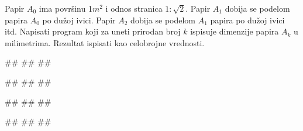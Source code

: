 \begin{Exercise}[difficulty=1, label=p1.papir] 
Papir $A_0$ ima povr\v sinu 1$m^2$ i odnos stranica
$1:\sqrt{2}$. Papir $A_1$ dobija se podelom papira $A_0$ po dužoj
ivici. Papir $A_2$ dobija se podelom $A_1$ papira po dužoj ivici
itd. Napisati program koji za uneti prirodan broj $k$ ispisuje 
dimenzije papira $A_k$ u milimetrima. Rezultat ispisati kao celobrojne
vrednosti.  
  
\begin{miditest}
\begin{upotreba}{1}
#\naslovInt#
##
##
\end{upotreba}
\end{miditest}
\begin{miditest}
\begin{upotreba}{2}
#\naslovInt#
##
##
\end{upotreba}
\end{miditest}

\begin{miditest}
\begin{upotreba}{3}
#\naslovInt#
##
##
\end{upotreba}
\end{miditest}
\begin{miditest}
\begin{upotreba}{4}
#\naslovInt#
##
##
\end{upotreba}
\end{miditest}
\end{Exercise}
\begin{Answer}[ref=p1.papir]
\end{Answer}



